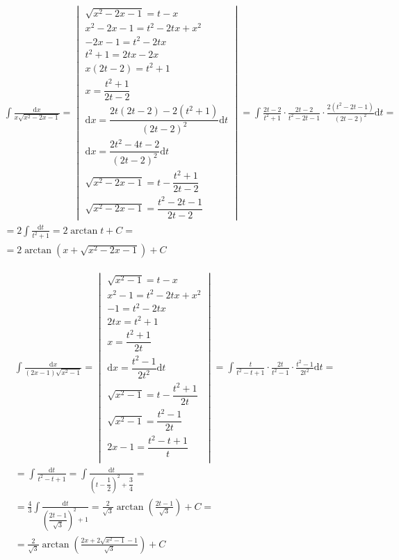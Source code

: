 \begin{gather*}
\int{\frac{\mbox{d}x}{x\sqrt{x^2-2x-1}}} =
\begin{vmatrix}
  \sqrt{x^2-2x-1}=t-x\\
  x^2-2x-1=t^2-2tx+x^2\\
  -2x-1=t^2-2tx\\
  t^2+1=2tx-2x\\
  x(2t-2)=t^2+1\\
  x=\dfrac{t^2+1}{2t-2}\\
  \mbox{d}x=\dfrac{2t(2t-2)-2(t^2+1)}{(2t-2)^2}\mbox{d}t\\
  \mbox{d}x=\dfrac{2t^2-4t-2}{(2t-2)^2}\mbox{d}t\\
  \sqrt{x^2-2x-1} = t-\dfrac{t^2+1}{2t-2} \\
  \sqrt{x^2-2x-1} = \dfrac{t^2-2t-1}{2t-2}
\end{vmatrix}
= \int{\frac{2t-2}{t^2+1}\cdot\frac{2t-2}{t^2-2t-1}\cdot\frac{2(t^2-2t-1)}{(2t-2)^2}\mbox{d}t} = \\
= 2\int{\frac{\mbox{d}t}{t^2+1}}
= 2\arctan{t} + C = \\
= 2\arctan{(x+\sqrt{x^2-2x-1})}+C
\end{gather*}


\begin{gather*}
\int{\frac{\mbox{d}x}{(2x-1)\sqrt{x^2-1}}} =
\begin{vmatrix}
  \sqrt{x^2-1}=t-x\\
  x^2-1=t^2-2tx+x^2\\
  -1=t^2-2tx\\
  2tx=t^2+1\\
  x=\dfrac{t^2+1}{2t}\\
  \mbox{d}x=\dfrac{t^2-1}{2t^2}\mbox{d}t\\
  \sqrt{x^2-1}=t-\dfrac{t^2+1}{2t}\\
  \sqrt{x^2-1}=\dfrac{t^2-1}{2t}\\
  2x-1=\dfrac{t^2-t+1}{t}\\
\end{vmatrix}
= \int{\frac{t}{t^2-t+1}\cdot\frac{2t}{t^2-1}\cdot\frac{t^2-1}{2t^2}\mbox{d}t} = \\
= \int{\frac{\mbox{d}t}{t^2-t+1}}
= \int{\frac{\mbox{d}t}{\left(t-\dfrac{1}{2}\right)^2+\dfrac{3}{4}}} = \\
= \frac{4}{3}\int{\frac{\mbox{d}t}{\left(\dfrac{2t-1}{\sqrt{3}}\right)^2+1}}
= \frac{2}{\sqrt{3}}\arctan{\left(\frac{2t-1}{\sqrt{3}}\right)}+C = \\
= \frac{2}{\sqrt{3}}\arctan{\left(\frac{2x+2\sqrt{x^2-1}-1}{\sqrt{3}}\right)}+C
\end{gather*}

